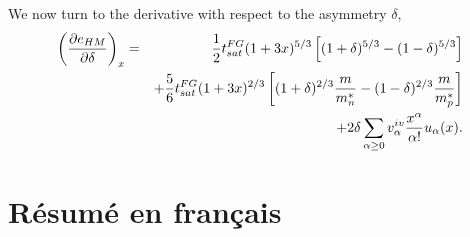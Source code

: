 %
We now turn to the derivative with respect to the asymmetry $\delta$,
%
\begin{eqnarray}
  \left(\frac{\partial e_{HM}}{\partial \delta}\right)_x &=&
  \frac{1}{2}t_{sat}^{FG}(1+3x)^{5/3}\left[(1+\delta)^{5/3} 
  - (1-\delta)^{5/3}\right]\notag\\
                                                         &&+ 
  \frac{5}{6}t_{sat}^{FG}(1+3x)^{2/3}\left[(1+\delta)^{2/3}\frac{m}{m_n^*} -
  (1-\delta)^{2/3}\frac{m}{m_p^*}\right]\notag\\
                                                         &&+
  2\delta \sum_{\alpha \geq 0}v_\alpha^{iv}\frac{x^\alpha}{\alpha!}u_\alpha(x).
\end{eqnarray}
%

\chapter{R\'esum\'e en fran\c{c}ais}\label{appendix:fr}
